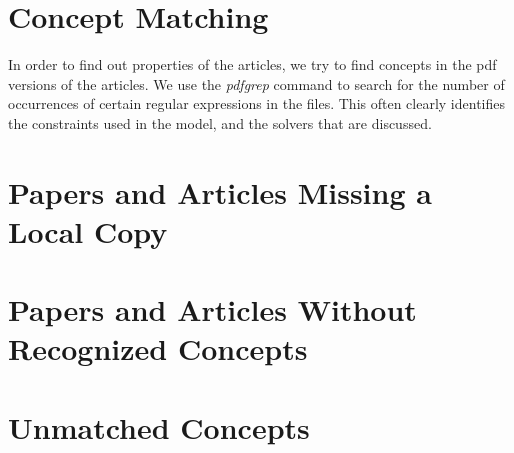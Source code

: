 \documentclass[a4paper]{article}
\begin{document}
\clearpage
\section{Concept Matching}

In order to find out properties of the articles, we try to find concepts in the pdf versions of the articles. We use the \emph{pdfgrep} command to search for the number of occurrences of certain regular expressions in the files. This often clearly identifies the constraints used in the model, and the solvers that are discussed.

%
%
%
%  
%  
%  
%  
%  
%  






\clearpage





\appendix
\clearpage
\section{Papers and Articles Missing a Local Copy}





\clearpage
\section{Papers and Articles Without Recognized Concepts}





\clearpage
\section{Unmatched Concepts}



\end{document}
